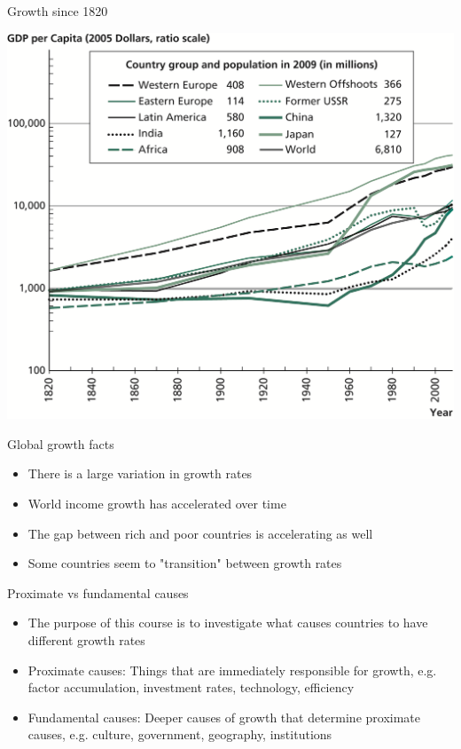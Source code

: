 \documentclass[10pt]{beamer}
\begin{document}
\begin{frame}[label={sec:orgf9a1f46}]{}
\alert{Growth since 1820}
\begin{center}
\includegraphics[width=.75\textwidth]{./img/1.7.png}
\end{center}
\end{frame}

\begin{frame}[label={sec:org457bfc1}]{}
\alert{Global growth facts}
\begin{itemize}
\item There is a large variation in growth rates
\item World income growth has accelerated over time
\item The gap between rich and poor countries is accelerating as well
\item Some countries seem to "transition" between growth rates
\end{itemize}
\end{frame}

\begin{frame}[label={sec:org54df4e2}]{}
\alert{Proximate vs fundamental causes}
\begin{itemize}
\item The purpose of this course is to investigate what \alert{causes} countries to have different growth rates
\item Proximate causes: Things that are immediately responsible for growth, e.g. factor accumulation, investment rates, technology, efficiency
\item Fundamental causes: Deeper causes of growth that determine proximate causes, e.g. culture, government, geography, institutions
\end{itemize}
\end{frame}
\end{document}
